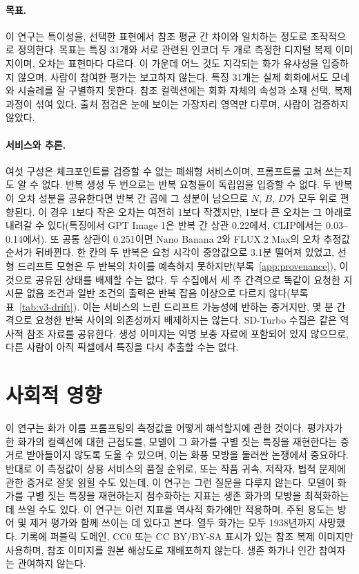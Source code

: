 \documentclass[10pt]{article}
\begin{document}
\paragraph{목표.} 이 연구는 특이성을, 선택한 표현에서 참조 평균 간 차이와 일치하는 정도로 조작적으로
정의한다. 목표는 특징 31개와 서로 관련된 인코더 두 개로 측정한 디지털 복제 이미지이며, 오차는 표현마다
다르다. 이 가운데 어느 것도 지각되는 화가 유사성을 입증하지 않으며, 사람이 참여한 평가는 보고하지 않는다.
특징 31개는 실제 회화에서도 모네와 시슬레를 잘 구별하지 못한다. 참조 컬렉션에는 회화 자체의 속성과 소재
선택, 복제 과정이 섞여 있다. 출처 점검은 눈에 보이는 가장자리 영역만 다루며, 사람이 검증하지 않았다.

\paragraph{서비스와 추론.} 여섯 구성은 체크포인트를 검증할 수 없는 폐쇄형 서비스이며, 프롬프트를 고쳐
쓰는지도 알 수 없다. 반복 생성 두 번으로는 반복 요청들이 독립임을 입증할 수 없다. 두 반복이 오차 성분을
공유한다면 반복 간 곱에 그 성분이 남으므로 $N$, $B$, $D$가 모두 위로 편향된다. 이 경우 1보다 작은 오차는
여전히 1보다 작겠지만, 1보다 큰 오차는 그 아래로 내려갈 수 있다(특징에서 GPT Image 1은 반복 간 상관
0.22에서, CLIP에서는 0.03--0.14에서). 또 공통 상관이 0.251이면 Nano Banana 2와 FLUX.2 Max의 오차
추정값 순서가 뒤바뀐다. 한 칸의 두 반복은 요청 시각이 중앙값으로 3.1분 떨어져 있었고, 선형 드리프트 모형은
두 반복의 차이를 예측하지 못하지만(부록~\ref{app:provenance}), 이것으로 공유된 상태를 배제할 수는 없다. 두
수집에서 세 주 간격으로 똑같이 요청한 지시문 없음 조건과 일반 조건의 출력은 반복 잡음 이상으로 다르지
않다(부록 표~\ref{tab:v3-drift}). 이는 서비스의 느린 드리프트 가능성에 반하는 증거지만, 몇 분 간격으로
요청한 반복 사이의 의존성까지 배제하지는 않는다. SD-Turbo 수집은 같은 역사적 참조 자료를 공유한다.
생성 이미지는 익명 보충 자료에 포함되어 있지 않으므로, 다른 사람이 아직 픽셀에서 특징을 다시 추출할 수는
없다.

\section*{사회적 영향}
이 연구는 화가 이름 프롬프팅의 측정값을 어떻게 해석할지에 관한 것이다. 평가자가 한 화가의 컬렉션에 대한
근접도를, 모델이 그 화가를 구별 짓는 특징을 재현한다는 증거로 받아들이지 않도록 도울 수 있으며, 이는
화풍 모방을 둘러싼 논쟁에서 중요하다. 반대로 이 측정값이 상용 서비스의 품질 순위로, 또는 작품 귀속,
저작자, 법적 문제에 관한 증거로 잘못 읽힐 수도 있는데, 이 연구는 그런 질문을 다루지 않는다. 모델이 화가를
구별 짓는 특징을 재현하는지 점수화하는 지표는 생존 화가의 모방을 최적화하는 데 쓰일 수도 있다. 이 연구는
이런 지표를 역사적 화가에만 적용하며, 주된 용도는 방어 및 제거 평가와 함께 쓰이는 데 있다고 본다. 열두
화가는 모두 1938년까지 사망했다. 기록에 퍼블릭 도메인, CC0 또는 CC BY/BY-SA 표시가 있는 참조 복제
이미지만 사용하며, 참조 이미지를 원본 해상도로 재배포하지 않는다. 생존 화가나 인간 참여자는 관여하지
않는다.
\end{document}
